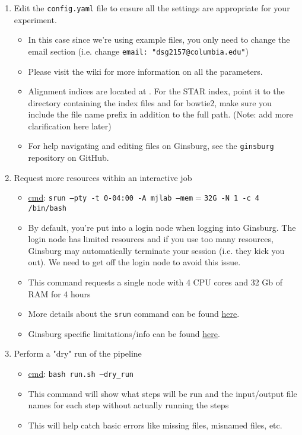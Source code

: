 \documentclass{article}
\begin{document}
\begin{enumerate}
        \item Edit the \texttt{config.yaml} file to ensure all the settings are appropriate for your experiment.
        \begin{itemize}
            \item In this case since we're using example files, you only need to change the email section (i.e. change \texttt{email: "dsg2157@columbia.edu"})
            \item Please visit the wiki for more information on all the parameters.
            \item Alignment indices are located at . For the STAR index, point it to the directory containing the index files and for bowtie2, make sure you include the file name prefix in addition to the full path. (Note: add more clarification here later)
            \item For help navigating and editing files on Ginsburg, see the \texttt{ginsburg} repository on GitHub. 
        \end{itemize}

        \item Request more resources within an interactive job
        \begin{itemize}
            \item \underline{cmd}: \texttt{srun --pty -t 0-04:00 -A mjlab --mem$=$32G -N 1 -c 4 /bin/bash}
            \item By default, you're put into a login node when logging into Ginsburg. The login node has limited resources and if you use too many resources, Ginsburg may automatically terminate your session (i.e. they kick you out). We need to get off the login node to avoid this issue.
            \item This command requests a single node with 4 CPU cores and 32 Gb of RAM for 4 hours
            \item More details about the \texttt{srun} command can be found \href{https://slurm.schedmd.com/srun.html}{here}.
            \item Ginsburg specific limitations/info can be found \href{https://columbiauniversity.atlassian.net/wiki/spaces/rcs/pages/62141877/Ginsburg+HPC+Cluster+User+Documentation}{here}.
        \end{itemize}

        \item Perform a "dry" run of the pipeline
        \begin{itemize}
            \item \underline{cmd}: \texttt{bash run.sh --dry\_run}
            \item This command will show what steps will be run and the input/output file names for each step without actually running the steps
            \item This will help catch basic errors like missing files, misnamed files, etc.
        \end{itemize}


\end{enumerate}
\end{document}
